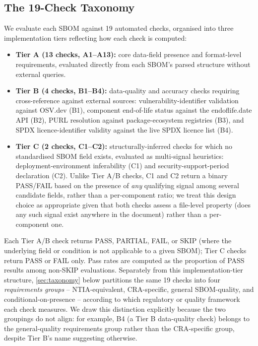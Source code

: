 \documentclass[11pt]{article}
\begin{document}
\subsection{The 19-Check Taxonomy}
\label{sec:taxonomy-tiers}

We evaluate each SBOM against 19 automated checks, organised into three implementation tiers reflecting how each check is computed:

\begin{itemize}
\item \textbf{Tier A (13 checks, A1--A13):} core data-field presence and format-level requirements, evaluated directly from each SBOM's parsed structure without external queries.
\item \textbf{Tier B (4 checks, B1--B4):} data-quality and accuracy checks requiring cross-reference against external sources: vulnerability-identifier validation against OSV.dev (B1), component end-of-life status against the endoflife.date API (B2), PURL resolution against package-ecosystem registries (B3), and SPDX licence-identifier validity against the live SPDX licence list (B4).
\item \textbf{Tier C (2 checks, C1--C2):} structurally-inferred checks for which no standardised SBOM field exists, evaluated as multi-signal heuristics: deployment-environment inferability (C1) and security-support-period declaration (C2). Unlike Tier A/B checks, C1 and C2 return a binary PASS/FAIL based on the presence of \emph{any} qualifying signal among several candidate fields, rather than a per-component ratio; we treat this design choice as appropriate given that both checks assess a file-level property (does any such signal exist anywhere in the document) rather than a per-component one.
\end{itemize}

Each Tier A/B check returns PASS, PARTIAL, FAIL, or SKIP (where the underlying field or condition is not applicable to a given SBOM); Tier C checks return PASS or FAIL only. Pass rates are computed as the proportion of PASS results among non-SKIP evaluations. Separately from this implementation-tier structure, \cref{sec:taxonomy} below partitions the same 19 checks into four \emph{requirements groups} -- NTIA-equivalent, CRA-specific, general SBOM-quality, and conditional-on-presence -- according to which regulatory or quality framework each check measures. We draw this distinction explicitly because the two groupings do not align: for example, B4 (a Tier B data-quality check) belongs to the general-quality requirements group rather than the CRA-specific group, despite Tier B's name suggesting otherwise.
\end{document}
